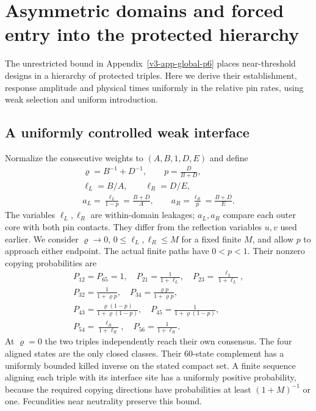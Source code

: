 \documentclass[aps,pre,reprint,amsmath,amssymb,longbibliography]{revtex4-2}
\begin{document}
\section{Asymmetric domains and forced entry into the protected hierarchy}
\label{app:asymmetric-entry-v2}

The unrestricted bound in Appendix~\ref{v3-app-global-p6} places
near-threshold designs in a hierarchy of protected triples. Here we derive
their establishment, response amplitude and physical times uniformly in
the relative pin rates, using weak selection and uniform introduction.

\subsection{A uniformly controlled weak interface}

Normalize the consecutive weights to $(A,B,1,D,E)$ and define
\begin{equation}
 \begin{gathered}
 \varrho=B^{-1}+D^{-1},\qquad p=\frac{D}{B+D},\\
 \ell_L=B/A,\qquad\ell_R=D/E,\\
 a_L=\frac{\ell_L}{1-p}=\frac{B+D}{A},\qquad
 a_R=\frac{\ell_R}{p}=\frac{B+D}{E}.
 \end{gathered}
 \label{eq:asym-coordinates-v2}
\end{equation}
The variables $\ell_L,\ell_R$ are within-domain leakages;
$a_L,a_R$ compare each outer core with both pin contacts. They differ
from the reflection variables $u,v$ used earlier. We consider
$\varrho\to0$, $0\leq\ell_L,\ell_R\leq M$ for a fixed finite $M$,
and allow $p$ to approach either endpoint. The actual finite paths
have $0<p<1$. Their nonzero copying probabilities are
\begin{equation}
 \begin{gathered}
 P_{12}=P_{65}=1,\quad
 P_{21}=\frac1{1+\ell_L},\quad
 P_{23}=\frac{\ell_L}{1+\ell_L},\\
 P_{32}=\frac1{1+\varrho p},\quad
 P_{34}=\frac{\varrho p}{1+\varrho p},\\
 P_{43}=\frac{\varrho(1-p)}{1+\varrho(1-p)},\quad
 P_{45}=\frac1{1+\varrho(1-p)},\\
 P_{54}=\frac{\ell_R}{1+\ell_R},\quad
 P_{56}=\frac1{1+\ell_R}.
 \end{gathered}
 \label{eq:asym-kernel-v2}
\end{equation}
At $\varrho=0$ the two triples independently reach their own
consensus. The four aligned states are the only closed classes.
Their 60-state complement has a uniformly bounded killed inverse
on the stated compact set. A finite sequence aligning each triple
with its interface site has a uniformly positive probability,
because the required copying directions have probabilities at least
$(1+M)^{-1}$ or one. Fecundities near neutrality preserve this
bound.
\end{document}
